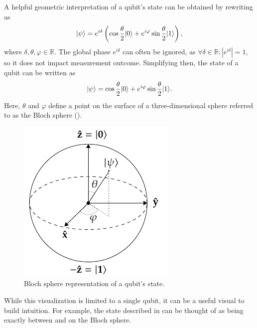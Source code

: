 A helpful geometric interpretation of a qubit's state can be obtained by rewriting  as
\begin{equation}
\vert{\psi}\rangle = e^{i\delta} \left(\cos\dfrac{\theta}{2}\vert{0}\rangle + e^{i\varphi}\sin\dfrac{\theta}{2}\vert{1}\rangle\right),
\end{equation}
where $\delta, \theta, \varphi \in \mathbb{R}$.
The global phase $e^{i\delta}$ can often be ignored, as $\forall \delta \in \mathbb{R} : |e^{i\delta}| = 1$, so it does not impact measurement outcome.
Simplifying then, the state of a qubit can be written as
\begin{equation}
\vert{\psi}\rangle = \cos\dfrac{\theta}{2}\vert{0}\rangle + e^{i\varphi}\sin\dfrac{\theta}{2}\vert{1}\rangle.
\end{equation}
Here, $\theta$ and $\varphi$ define a point on the surface of a three-dimensional sphere referred to as the Bloch sphere ().
\begin{figure}[ht]
    \centering
    \includegraphics[width=0.375\linewidth]{figures/bloch-sphere.pdf}
    \caption[Bloch sphere representation of a qubit's state.]{
        Bloch sphere representation of a qubit's state.
    }
    \label{fig:bloch-sphere}
\end{figure}
While this visualization is limited to a single qubit, it can be a useful visual to build intuition.
For example, the \ket{+} state described in  can be thought of as being exactly between  and  on the Bloch sphere.

